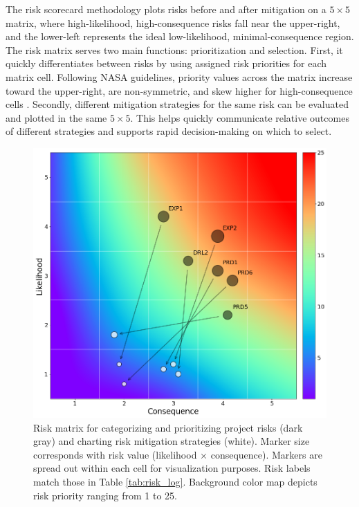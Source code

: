 The risk scorecard methodology plots risks before and after mitigation on a \({5\times5}\) matrix, where high-likelihood, high-consequence risks fall near the upper-right, and the lower-left represents the ideal low-likelihood, minimal-consequence region. The risk matrix serves two main functions: prioritization and selection. First, it quickly differentiates between risks by using assigned risk priorities for each matrix cell. Following NASA guidelines, priority values across the matrix increase toward the upper-right, are non-symmetric, and skew higher for high-consequence cells \citep{nasa_s3001_2017}. Secondly, different mitigation strategies for the same risk can be evaluated and plotted in the same \({5\times5}\). This helps quickly communicate relative outcomes of different strategies and supports rapid decision-making on which to select.

\begin{figure}%
\centering
\includegraphics[width=\linewidth]{templates/images/Figure-Risk_Matrix.png}
\caption[Geothermal project risk matrix]{Risk matrix for categorizing and prioritizing project risks (dark gray) and charting risk mitigation strategies (white). Marker size corresponds with risk value (likelihood $\times$ consequence). Markers are spread out within each cell for visualization purposes. Risk labels match those in Table \ref{tab:risk_log}. Background color map depicts risk priority ranging from 1 to 25.}
\label{fig:risk_matrix}
\end{figure}

